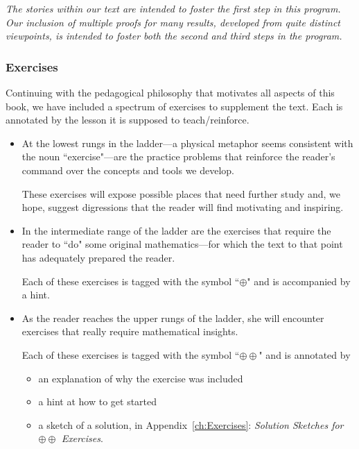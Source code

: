 \medskip

{\em The stories within our text are intended to foster the first step in this program.  Our inclusion of  multiple proofs for many results, developed from quite distinct viewpoints, is intended to foster both the second and third steps in the program. }

\subsubsection{Exercises}

Continuing with the pedagogical philosophy that motivates all aspects of this book, we have included a spectrum of exercises to supplement the text.  Each is annotated by the lesson it is supposed to teach/reinforce.
\begin{itemize}
\item
At the lowest rungs in the ladder---a physical metaphor seems consistent with the noun ``exercise"---are the practice problems that reinforce the reader's command over the concepts and tools we develop.

\smallskip

These exercises will expose possible places that need further study and, we hope, suggest digressions that the reader will find motivating and inspiring.

\medskip\item
In the intermediate range of the ladder are the exercises that require the reader to ``do" some original mathematics---for which the text to that point has adequately prepared the reader. 

\smallskip

Each of these exercises is tagged with the symbol ``$\oplus$" and is accompanied by a hint.

\medskip\item
As the reader reaches the upper rungs of the ladder, she will encounter exercises that really require mathematical insights.

\smallskip

Each of these exercises is tagged with the symbol ``$\oplus \oplus$" and is annotated by
  \begin{itemize}
  \item
an explanation of why the exercise was included
  \medskip\item
a hint at how to get started
  \medskip\item
a sketch of a solution, in Appendix~\ref{ch:Exercises}: {\em Solution Sketches for $\oplus \oplus$ Exercises}.
  \end{itemize} 


\end{itemize}

